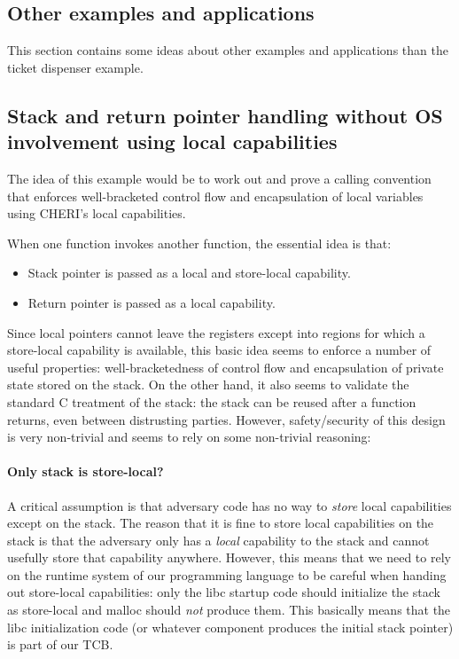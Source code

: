 \documentclass[a4paper]{article}
\begin{document}
\begin{lemma}
\section{Other examples and applications}
\label{sec:other_apps}
This section contains some ideas about other examples and applications than the
ticket dispenser example.

\subsection{Stack and return pointer handling without OS involvement using local
  capabilities}
The idea of this example would be to work out and prove a calling convention
that enforces well-bracketed control flow and encapsulation of local variables
using CHERI's local capabilities.

When one function invokes another function, the essential idea is that:
\begin{itemize}
\item Stack pointer is passed as a local and store-local capability.
\item Return pointer is passed as a local capability.
\end{itemize}

Since local pointers cannot leave the registers except into regions for which a
store-local capability is available, this basic idea seems to enforce a number
of useful properties: well-bracketedness of control flow and encapsulation of
private state stored on the stack. On the other hand, it also seems to validate
the standard C treatment of the stack: the stack can be reused after a function
returns, even between distrusting parties. However, safety/security of this
design is very non-trivial and seems to rely on some non-trivial reasoning:

\paragraph{Only stack is store-local?}
A critical assumption is that adversary code has no way to \emph{store} local
capabilities except on the stack. The reason that it is fine to store local
capabilities on the stack is that the adversary only has a \emph{local}
capability to the stack and cannot usefully store that capability anywhere.
However, this means that we need to rely on the runtime system of our
programming language to be careful when handing out store-local capabilities:
only the libc startup code should initialize the stack as store-local and malloc
should \emph{not} produce them. This basically means that the libc
initialization code (or whatever component produces the initial stack pointer)
is part of our TCB.


\end{lemma}
\end{document}
